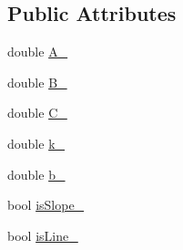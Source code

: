 \subsection*{Public Attributes}
\begin{DoxyCompactItemize}
\item 
double \hyperlink{classnubot_1_1Line___a78d6e6771b3542aeac3092b28c6f8477}{A\-\_\-}
\item 
double \hyperlink{classnubot_1_1Line___a6ec007dca1b1a5ae1132290dea230545}{B\-\_\-}
\item 
double \hyperlink{classnubot_1_1Line___a2949bf29de27c89c653afb5ca77c30d3}{C\-\_\-}
\item 
double \hyperlink{classnubot_1_1Line___a569a0bc980db41b36ad5471811b8dc87}{k\-\_\-}
\item 
double \hyperlink{classnubot_1_1Line___a57c955f64b7b2ecf2858f589c1880a45}{b\-\_\-}
\item 
bool \hyperlink{classnubot_1_1Line___a24e8175ccedd35f48fea06f34f0e4ee6}{is\-Slope\-\_\-}
\item 
bool \hyperlink{classnubot_1_1Line___accfccb14bb889d1579c653aed927fb82}{is\-Line\-\_\-}
\end{DoxyCompactItemize}


